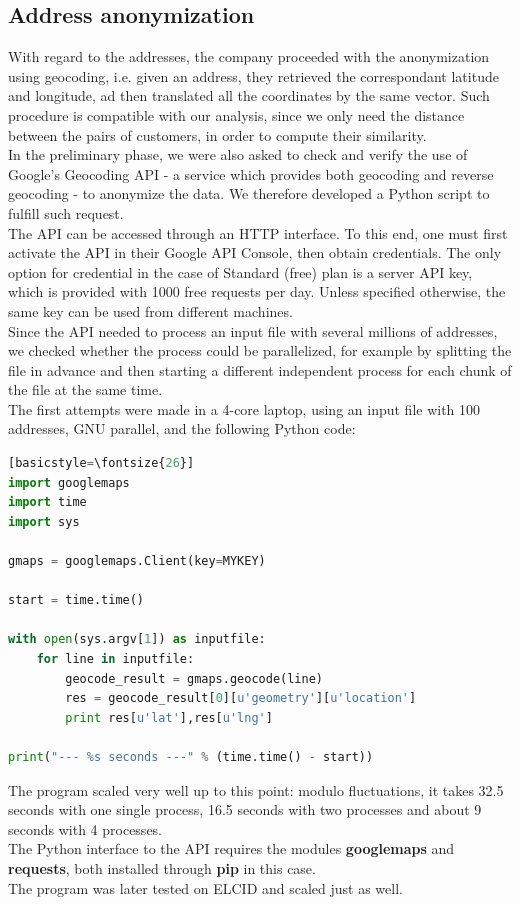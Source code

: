 \documentclass[a4paper,11pt]{book}
\begin{document}
\subsection{Address anonymization}
With regard to the addresses, the company proceeded with the anonymization using geocoding, i.e. given an address, they retrieved the correspondant latitude and longitude, ad then translated all the coordinates by the same vector. Such procedure is compatible with our analysis, since we only need the distance between the pairs of customers, in order to compute their similarity.\\
In the preliminary phase, we were also asked to check and verify the use of Google’s Geocoding API - a service which provides both geocoding and reverse geocoding - to anonymize the data. We therefore developed a Python script to fulfill such request.\\
The API can be accessed through an HTTP interface. To this end, one must first activate the API in their Google API Console\cite{cons}, then obtain credentials. The only option for credential in the case of Standard (free) plan is a server API key\cite{key}, which is provided with 1000 free requests per day. Unless specified otherwise, the same key can be used from different machines.\\

Since the API needed to process an input file with several millions of addresses, we checked whether the process could be parallelized, for example by splitting the file in advance and then starting a different independent process for each chunk of the file at the same time.\\
The first attempts were made in a 4-core laptop, using an input file with 100 addresses, GNU parallel, and the following Python code:
\begin{center}
\begin{lstlisting}[language=Python][basicstyle=\fontsize{26}]
import googlemaps
import time
import sys

gmaps = googlemaps.Client(key=MYKEY)

start = time.time()

with open(sys.argv[1]) as inputfile:
    for line in inputfile:
        geocode_result = gmaps.geocode(line)
        res = geocode_result[0][u'geometry'][u'location']
        print res[u'lat'],res[u'lng']

print("--- %s seconds ---" % (time.time() - start))

\end{lstlisting}
\end{center}
The program scaled very well up to this point: modulo fluctuations, it takes 32.5 seconds with one single process, 16.5 seconds with two processes and about 9 seconds with 4 processes.\\
The Python interface to the API requires the modules \textbf{googlemaps} and \textbf{requests}, both installed through \textbf{pip} in this case.\\
The program was later tested on ELCID and scaled just as well.
\end{document}
